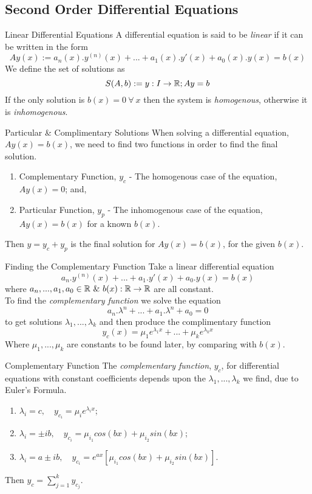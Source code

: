 \documentclass[11pt,a4paper]{article}
\begin{document}
\subsection{Second Order Differential Equations}
%
\subtitle{Definition 6.05 - }{Linear Differential Equations}
A differential equation is said to be \textit{linear} if it can be written in the form $$Ay(x) := a_n(x).y^{(n)}(x) + ... + a_1(x).y'(x) + a_0(x).y(x) = b(x)$$
We define the set of solutions as $$S(A, b) := {y : I \to \mathbb{R} ; Ay = b}$$
If the only solution is $b(x) = 0\ \forall\ x$ then the system is \textit{homogenous}, otherwise it is \textit{inhomogenous}.

\subtitle{Definition 6.06 - }{Particular \& Complimentary Solutions}
When solving a differential equation, $Ay(x) = b(x)$, we need to find two functions in order to find the final solution.
\begin{enumerate}[label=\roman*)]
  \item Complementary Function, $y_c$ - The homogenous case of the equation, $Ay(x) = 0$; and,
  \item Particular Function, $y_p$ - The inhomogenous case of the equation, $Ay(x) = b(x)$ for a known $b(x)$.
\end{enumerate}
Then $y = y_c + y_p$ is the final solution for $Ay(x) = b(x)$, for the given $b(x)$.\\

\subtitle{Theorem 6.07 - }{Finding the Complementary Function}
Take a linear differential equation $$a_n.y^{(n)}(x) + ... + a_1.y'(x) + a_0.y(x) = b(x)$$ where $a_n, ... , a_1, a_0 \in \real\ \mathrm{\&}\ b(x) : \real \to \real$ are all constant. \\
To find the \textit{complementary function} we solve the equation
$$a_n.\lambda^n + ... + a_1.\lambda^n + a_0 = 0$$
to get solutions $\lambda_1, ... , \lambda_k$ and then produce the complimentary function
$$y_c(x) = \mu_1e^{\lambda_1x} + ... + \mu_ke^{\lambda_kx}$$
Where $\mu_1, ... , \mu_k$ are constants to be found later, by comparing with $b(x)$.\\

\subtitle{Remark 6.08 - }{Complementary Function}
The \textit{complementary function}, $y_c$, for differential equations with constant coefficients depends upon the $\lambda_1, ... , \lambda_k$ we find, due to Euler's Formula.
\begin{enumerate}[label=\roman*)]
  \item $\lambda_i = c,\quad y_{c_i} = \mu_ie^{\lambda_ix}$;
  \item $\lambda_i = \pm ib,\quad y_{c_i} = \mu_{i_1}cos(bx) + \mu_{i_2}sin(bx)$;
  \item $\lambda_i = a \pm ib,\quad y_{c_i} = e^{ax}[\mu_{i_1}cos(bx) + \mu_{i_2}sin(bx)]$.
\end{enumerate}
Then $y_c = \sum_{j=1}^{k} y_{c_j}$.\\
\end{document}
